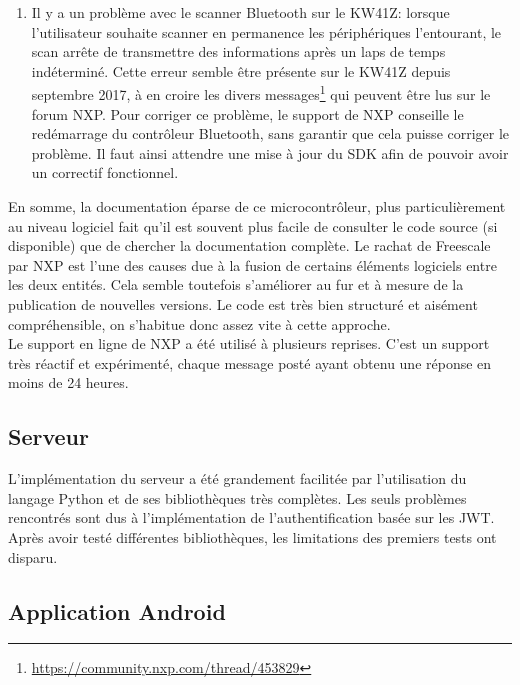 \begin{enumerate}
    \item Il y a un problème avec le scanner Bluetooth sur le KW41Z: lorsque l'utilisateur souhaite scanner en permanence les périphériques l'entourant, le scan arrête de transmettre des informations après un laps de temps indéterminé. Cette erreur semble être présente sur le KW41Z depuis septembre 2017, à en croire les divers messages\footnote{\url{https://community.nxp.com/thread/453829}} qui peuvent être lus sur le forum NXP. Pour corriger ce problème, le support de NXP conseille le redémarrage du contrôleur Bluetooth, sans garantir que cela puisse corriger le problème. Il faut ainsi attendre une mise à jour du SDK afin de pouvoir avoir un correctif fonctionnel.
\end{enumerate}

En somme, la documentation éparse de ce microcontrôleur, plus particulièrement au niveau logiciel fait qu'il est souvent plus facile de consulter le code source (si disponible) que de chercher la documentation complète. Le rachat de Freescale par NXP est l'une des causes due à la fusion de certains éléments logiciels entre les deux entités. Cela semble toutefois s'améliorer au fur et à mesure de la publication de nouvelles versions. Le code est très bien structuré et aisément compréhensible, on s'habitue donc assez vite à cette approche. \\

Le support en ligne de NXP a été utilisé à plusieurs reprises. C'est un support très réactif et expérimenté, chaque message posté ayant obtenu une réponse en moins de 24 heures. 


\subsection{Serveur}

L'implémentation du serveur a été grandement facilitée par l'utilisation du langage Python et de ses bibliothèques très complètes. Les seuls problèmes rencontrés sont dus à l'implémentation de l'authentification basée sur les JWT. Après avoir testé différentes bibliothèques, les limitations des premiers tests ont disparu. 

\subsection{Application Android}


